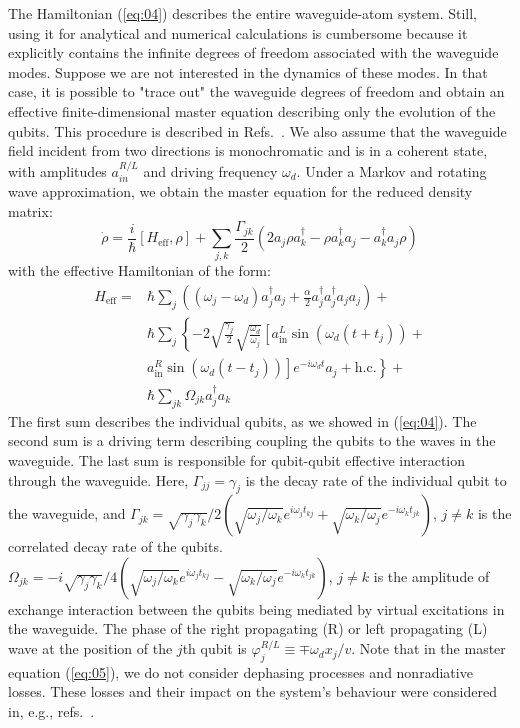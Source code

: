 \documentclass[lettersize,journal]{IEEEtran}
\begin{document}
The Hamiltonian (\ref{eq:04}) describes the entire waveguide-atom system. Still, using it for analytical and numerical calculations is cumbersome because it explicitly contains the infinite degrees of freedom associated with the waveguide modes.
Suppose we are not interested in the dynamics of these modes. 
In that case, it is possible to "trace out" the waveguide degrees of freedom and obtain an effective finite-dimensional master equation describing only the evolution of the qubits. 
This procedure is described in Refs.~\cite{gardiner2004quantum,lehmberg_radiation_1970,lalumiere_input-output_2013}. 
We also assume that the waveguide field incident from two directions is monochromatic and is in a coherent state, with amplitudes $a_{in}^{R/L}$ and driving frequency $\omega_d$. 
Under a Markov and rotating wave approximation, we obtain the master equation for the reduced density matrix:
\begin{equation} \label{eq:05}
    \dot{\rho} = \frac{i}{\hbar} \left[ H_\mathrm{eff}, \rho \right] + \sum_{j,k} \frac{\Gamma_{jk}}{2} \left( 2 a_j \rho a_k^\dag - \rho a_k^\dag a_j - a_k^\dag a_j \rho \right)
\end{equation}
with the effective Hamiltonian of the form:
\begin{align} \label{eq:06}
    H_\mathrm{eff} =& \hbar \sum_j \left( (\omega_j - \omega_d) a_j^\dag a_j + \frac{\alpha}{2} a_j^\dag a_j^\dag a_j a_j \right) + \nonumber \\
    &\hbar \sum_j \left\{ -2 \sqrt{\frac{\gamma_j}{2}} \sqrt{\frac{\omega_d}{\omega_j}} \left[ a_\mathrm{in}^L \sin(\omega_d (t + t_j)) + \right.\right.\\
    &\left.\left.a_\mathrm{in}^R \sin(\omega_d (t - t_j)) \right] e^{-i \omega_d t} a_j + \mathrm{h.c.} \right\} + \nonumber \\
    &\hbar \sum_{jk} \Omega_{jk} a_j^\dag a_k \nonumber
\end{align}
The first sum describes the individual qubits, as we showed in (\ref{eq:04}).
The second sum is a driving term describing coupling the qubits to the waves in the waveguide.
The last sum is responsible for qubit-qubit effective interaction through the waveguide.
Here, $\Gamma_{jj} = \gamma_j$ is the decay rate of the individual qubit to the waveguide, and $\Gamma_{jk} = \sqrt{\gamma_j \gamma_k}/2 \left( \sqrt{\omega_j / \omega_k} e^{i \omega_j t_{kj}} +  \sqrt{\omega_k / \omega_j} e^{-i \omega_k t_{jk}}\right)$, $j\neq k$ is the correlated decay rate of the qubits.
$\Omega_{jk} = -i\sqrt{\gamma_j \gamma_k}/4 \left( \sqrt{\omega_j / \omega_k} e^{i \omega_j t_{kj}} -  \sqrt{\omega_k / \omega_j} e^{-i \omega_k t_{jk}} \right)$, $j\neq k$ is the amplitude of exchange interaction between the qubits being mediated by virtual excitations in the waveguide.
The phase of the right propagating (R) or left propagating (L) wave at the position of the $j$th qubit is $\varphi_j^{R/L} \equiv \mp \omega_d x_j / v$.
Note that in the master equation (\ref{eq:05}), we do not consider dephasing processes and nonradiative losses. 
These losses and their impact on the system's behaviour were considered in, e.g., refs.~\cite{rosario_hamann_rectangular_2019, Nefedkin2022}.
\end{document}
